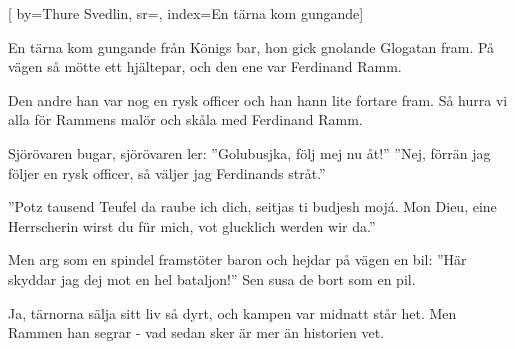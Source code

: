 
[
	by={Thure Svedlin},
	sr={},
	index={En tärna kom gungande}]

\beginverse*
En tärna kom gungande från Königs bar,
hon gick gnolande Glogatan fram.
På vägen så mötte ett hjältepar,
och den ene var Ferdinand Ramm.
\endverse

\beginverse*
Den andre han var nog en rysk officer
och han hann lite fortare fram.
Så hurra vi alla för Rammens malör
och skåla med Ferdinand Ramm.
\endverse

\beginverse*
Sjörövaren bugar, sjörövaren ler:
''Golubusjka, följ mej nu åt!''
''Nej, förrän jag följer en rysk officer,
så väljer jag Ferdinands stråt.''
\endverse

\beginverse*
''Potz tausend Teufel da raube ich dich,
seitjas ti budjesh mojá.
Mon Dieu, eine Herrscherin wirst du für mich,
vot glucklich werden wir da.''
\endverse

\beginverse*
Men arg som en spindel framstöter baron
och hejdar på vägen en bil:
''Här skyddar jag dej mot en hel bataljon!''
Sen susa de bort som en pil.
\endverse

\beginverse*
Ja, tärnorna sälja sitt liv så dyrt,
och kampen var midnatt står het.
Men Rammen han segrar - vad sedan sker
är mer än historien vet.
\endverse
\endsong